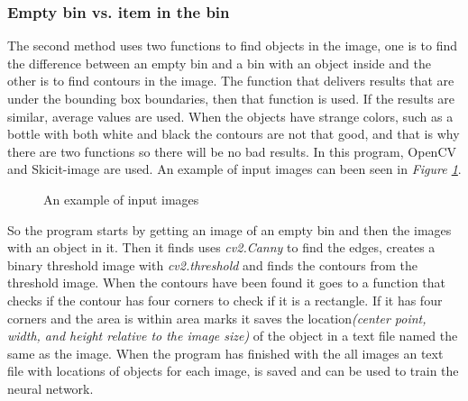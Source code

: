 \subsubsection*{Empty bin vs. item in the bin}\label{emptyvsitem}
The second method uses two functions to find objects in the image, one is to find the difference between an empty bin and a bin with an object inside and the other is to find contours in the image. 
The function that delivers results that are under the bounding box boundaries, then that function is used. If the results are similar, average values are used.
When the objects have strange colors, such as a bottle with both white and black the contours are not that good, and that is why there are two functions so there will be no bad results. 
In this program, OpenCV and Skicit-image are used. An example of input images can been seen in \textit{Figure \ref{figure: emptyafter}}.
\begin{figure}[h]
 \centering
 \hfill
 \caption{An example of input images}
 \label{figure: emptyafter}
\end{figure}

So the program starts by getting an image of an empty bin and then the images with an object in it. 
Then it finds uses \textit{cv2.Canny} to find the edges, creates a binary threshold image with \textit{cv2.threshold} and finds the contours from the threshold image. 
When the contours have been found it goes to a function that checks if the contour has four corners to check if it is a rectangle. 
If it has four corners and the area is within area marks it saves the location\textit{(center point, width, and height relative to the image size)} of the object in a text file named the same as the image. 
When the program has finished with the all images an text file with locations of objects for each image, is saved and can be used to train the neural network. 


